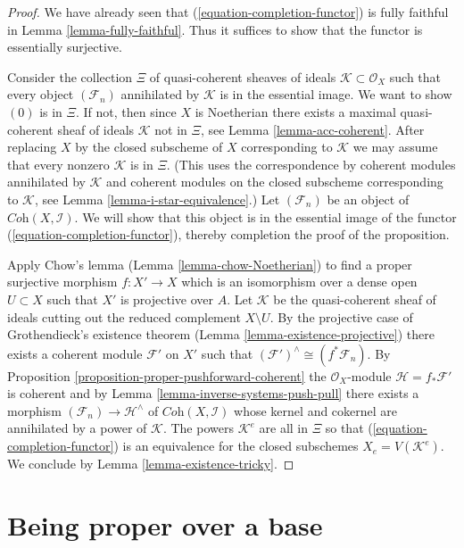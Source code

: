 \begin{proof}
We have already seen that (\ref{equation-completion-functor}) is
fully faithful in Lemma \ref{lemma-fully-faithful}. Thus it suffices
to show that the functor is essentially surjective.

\medskip\noindent
Consider the collection $\Xi$ of quasi-coherent sheaves of ideals
$\mathcal{K} \subset \mathcal{O}_X$ such that every object
$(\mathcal{F}_n)$ annihilated by $\mathcal{K}$ is in the essential image.
We want to show $(0)$ is in $\Xi$. If not, then since $X$ is Noetherian
there exists a maximal quasi-coherent sheaf of ideals $\mathcal{K}$
not in $\Xi$, see
Lemma \ref{lemma-acc-coherent}.
After replacing $X$ by the closed subscheme of $X$
corresponding to $\mathcal{K}$ we may assume that every nonzero
$\mathcal{K}$ is in $\Xi$. (This uses the correspondence by
coherent modules annihilated by $\mathcal{K}$ and coherent modules
on the closed subscheme corresponding to $\mathcal{K}$, see
Lemma \ref{lemma-i-star-equivalence}.)
Let $(\mathcal{F}_n)$ be an object of
$\textit{Coh}(X, \mathcal{I})$.
We will show that this object is in the essential image of the
functor (\ref{equation-completion-functor}), thereby completion the
proof of the proposition.

\medskip\noindent
Apply Chow's lemma (Lemma \ref{lemma-chow-Noetherian}) to find a
proper surjective morphism $f : X' \to X$ which is an isomorphism
over a dense open $U \subset X$ such that $X'$ is projective over $A$.
Let $\mathcal{K}$ be the quasi-coherent sheaf of ideals cutting
out the reduced complement $X \setminus U$. By the projective
case of Grothendieck's existence theorem
(Lemma \ref{lemma-existence-projective})
there exists a coherent module $\mathcal{F}'$ on $X'$ such
that $(\mathcal{F}')^\wedge \cong (f^*\mathcal{F}_n)$. By
Proposition \ref{proposition-proper-pushforward-coherent}
the $\mathcal{O}_X$-module $\mathcal{H} = f_*\mathcal{F}'$ is coherent
and by Lemma \ref{lemma-inverse-systems-push-pull}
there exists a morphism $(\mathcal{F}_n) \to \mathcal{H}^\wedge$
of $\textit{Coh}(X, \mathcal{I})$ whose kernel and cokernel are
annihilated by a power of $\mathcal{K}$. The powers $\mathcal{K}^e$
are all in $\Xi$ so that (\ref{equation-completion-functor})
is an equivalence for the closed subschemes $X_e = V(\mathcal{K}^e)$.
We conclude by Lemma \ref{lemma-existence-tricky}.
\end{proof}





\section{Being proper over a base}
\label{section-proper-over-base}

